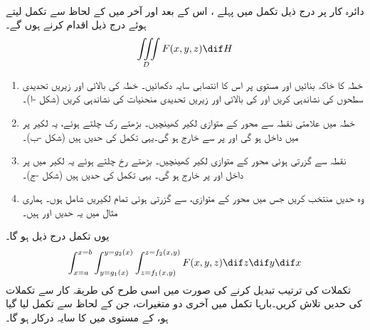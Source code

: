 \\
دائرہ کار  پر درج ذیل تکمل میں  پہلے  ، اس کے بعد  اور آخر میں    کے لحاظ سے تکمل لیتے ہوئے  درج ذیل اقدام کرنے ہوں گے۔
\begin{align*}
\iiint\limits_D F(x,y,z)\dif H
\end{align*}
\begin{enumerate}[1.]
\item
{}\quad
خطہ  کا خاکہ بنائیں اور مستوی  پر  اس کا انتصابی سایہ   دکھائیں۔  خطہ  کی بالائی اور زیریں تحدیدی سطحوں کی نشاندہی کریں اور  کی بالائی اور زیریں تحدیدی منحنیات  کی نشاندہی کریں (شکل -ا)۔
\item
{}\quad
خطہ  میں  علامتی نقطہ  سے  محور کے متوازی  لکیر  کھینچیں۔  بڑھتے   رک چلتے ہوئے،  یہ لکیر  پر  میں داخل ہو گی اور   پر  سے خارج ہو گی۔یہی تکمل کی   حدیں ہیں (شکل -ب)۔
\item
{}\quad
 نقطہ  سے گزرتی ہوئی   محور کے متوازی  لکیر  کھینچیں۔ بڑھتے  رخ چلتے ہوئے  یہ لکیر  میں  پر داخل اور  پر خارج ہو گی۔ یہی تکمل کی  حدیں ہیں (شکل -ج)۔
\item
{}\quad
وہ  حدیں منتخب کریں جس میں  محور  کے متوازی،   سے گزرتی ہوئی تمام لکیریں    شامل ہوں۔ ہماری مثال میں  یہ حدیں   اور  ہیں۔
\end{enumerate}
یوں تکمل درج ذیل ہو گا۔
\begin{align*}
\int_{x=a}^{x=b}\int_{y=g_1(x)}^{y=g_2(x)}\int_{z=f_1(x,y)}^{z=f_2(x,y)}F(x,y,z)\dif z\dif y\dif x
\end{align*}
تکملات کی ترتیب  تبدیل کرنے کی صورت میں اسی طرح کی طریقہ کار سے تکملات کی حدیں تلاش کریں۔بارہا تکمل میں آخری دو متغیرات،  جن کے لحاظ سے تکمل لیا  گیا ہو، کے مستوی میں  کا سایہ درکار ہو گا۔

